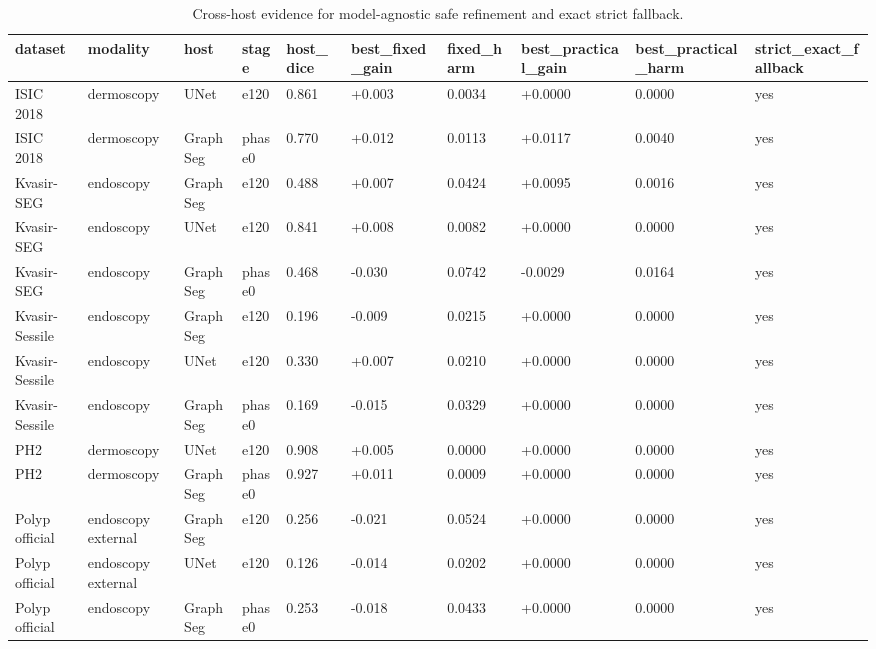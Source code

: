 \begin{table}[t]
\centering
\small
\caption{Cross-host evidence for model-agnostic safe refinement and exact strict fallback.}
\label{tab:cross_host_model_agnostic}
\begin{tabular}{llllllllll}
\toprule
dataset & modality & host & stage & host\_dice & best\_fixed\_gain & fixed\_harm & best\_practical\_gain & best\_practical\_harm & strict\_exact\_fallback \\
\midrule
ISIC 2018 & dermoscopy & UNet & e120 & 0.861 & +0.003 & 0.0034 & +0.0000 & 0.0000 & yes \\
ISIC 2018 & dermoscopy & GraphSeg & phase0 & 0.770 & +0.012 & 0.0113 & +0.0117 & 0.0040 & yes \\
Kvasir-SEG & endoscopy & GraphSeg & e120 & 0.488 & +0.007 & 0.0424 & +0.0095 & 0.0016 & yes \\
Kvasir-SEG & endoscopy & UNet & e120 & 0.841 & +0.008 & 0.0082 & +0.0000 & 0.0000 & yes \\
Kvasir-SEG & endoscopy & GraphSeg & phase0 & 0.468 & -0.030 & 0.0742 & -0.0029 & 0.0164 & yes \\
Kvasir-Sessile & endoscopy & GraphSeg & e120 & 0.196 & -0.009 & 0.0215 & +0.0000 & 0.0000 & yes \\
Kvasir-Sessile & endoscopy & UNet & e120 & 0.330 & +0.007 & 0.0210 & +0.0000 & 0.0000 & yes \\
Kvasir-Sessile & endoscopy & GraphSeg & phase0 & 0.169 & -0.015 & 0.0329 & +0.0000 & 0.0000 & yes \\
PH2 & dermoscopy & UNet & e120 & 0.908 & +0.005 & 0.0000 & +0.0000 & 0.0000 & yes \\
PH2 & dermoscopy & GraphSeg & phase0 & 0.927 & +0.011 & 0.0009 & +0.0000 & 0.0000 & yes \\
Polyp official & endoscopy external & GraphSeg & e120 & 0.256 & -0.021 & 0.0524 & +0.0000 & 0.0000 & yes \\
Polyp official & endoscopy external & UNet & e120 & 0.126 & -0.014 & 0.0202 & +0.0000 & 0.0000 & yes \\
Polyp official & endoscopy & GraphSeg & phase0 & 0.253 & -0.018 & 0.0433 & +0.0000 & 0.0000 & yes \\
\bottomrule
\end{tabular}
\end{table}
